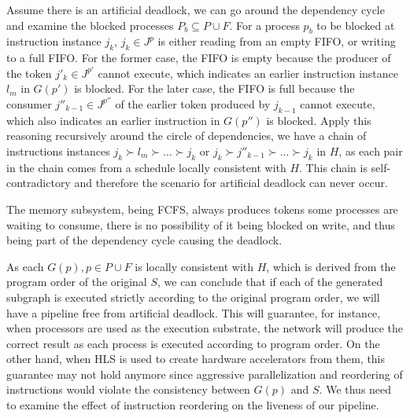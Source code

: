 Assume there is an artificial deadlock, we can go around the dependency
cycle and examine the blocked processes $P_b \subseteq P \cup F$. For a process $p_b$
to be blocked at instruction instance $j_k$, $j_k \in J^p$ is either reading from an empty
FIFO, or writing to a full FIFO. For the former case, the FIFO is empty because the producer of the token
$j'_k \in J^{p'}$ cannot execute, which indicates an earlier instruction 
instance $l_m$ in $G(p')$ is blocked. For the later case, the FIFO is full because the consumer $j''_{k-1} \in J^{p''}$ of the earlier token produced by
$j_{k-1}$ cannot execute, which also indicates an earlier instruction in $G(p'')$
is blocked. Apply this reasoning recursively around the circle of dependencies,
we have a chain of instructions instances $j_k \succ l_m \succ ... \succ j_k$
or $j_k \succ j''_{k-1} \succ ... \succ j_k$ in $H$, as each pair in the chain
comes from a schedule locally consistent with $H$. This chain is self-contradictory
and therefore the scenario for artificial deadlock can never occur. 

The memory subsystem, being FCFS, always produces tokens some processes are waiting to consume, there is no possibility of it being blocked on write, and thus being
part of the dependency cycle causing the deadlock.


As each $G(p), p \in P \cup F$ is locally consistent with $H$, which is derived from
the program order of the original $S$, we can conclude that if each of
the generated subgraph is executed strictly according to the original
program order, we will have a pipeline free from artificial deadlock. This
will guarantee, for instance, when processors are used as the execution substrate, the network will produce the correct result as
each process is executed according to program order. On the other hand, when
HLS is used to create hardware accelerators from them, this guarantee may not
hold anymore since aggressive parallelization and reordering of instructions
would violate the consistency between $G(p)$ and $S$. We thus need to examine
the  effect of instruction reordering on the liveness of our pipeline.



